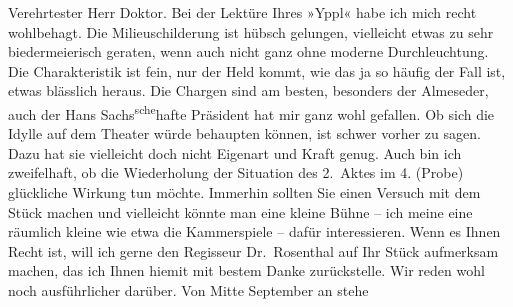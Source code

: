 \begin{ledgroupsized}[t]{13cm}
           \pstart\center{}Verehrtester Herr Doktor.\pend\pstart
           Bei der Lektüre Ihres »Yppl« habe ich mich recht
               wohlbehagt. Die Milieuschilderung ist hübsch gelungen, vielleicht etwas zu sehr
               biedermeierisch geraten, wenn auch nicht ganz ohne moderne Durchleuchtung. Die
               Charakteristik ist fein, nur der Held kommt, wie das ja so häufig der Fall ist, etwas
               blässlich heraus. Die Chargen sind am besten, besonders der Almeseder, auch der Hans Sachs\substVorne{}\textsuperscript{sche}\substDazwischen{}hafte\substHinten{} Präsident hat mir ganz wohl gefallen.\pend
           \pstart
           Ob sich die Idylle auf dem Theater würde behaupten können, ist schwer vorher zu
               sagen. Dazu hat sie vielleicht doch nicht Eigenart und Kraft genug. Auch bin ich
               zweifelhaft, ob die Wiederholung der Situation des 2. Aktes im 4. (Probe) glückliche
               Wirkung tun möchte. Immerhin sollten Sie einen Versuch mit dem {\pb}Stück machen und vielleicht
               könnte man eine kleine Bühne – ich meine eine räumlich kleine wie etwa die Kammerspiele – dafür interessieren. Wenn es Ihnen
               Recht ist, will ich gerne den Regisseur Dr. Rosenthal auf Ihr Stück aufmerksam machen, das ich Ihnen hiemit mit bestem Danke zurückstelle.
               Wir reden wohl noch ausführlicher darüber. Von Mitte September an stehe

\end{ledgroupsized}
